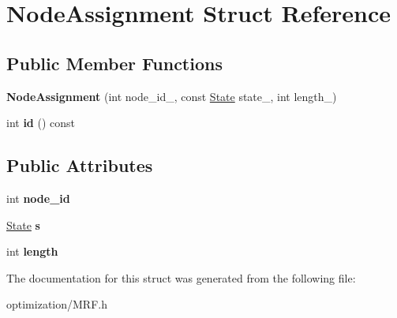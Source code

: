 \hypertarget{structNodeAssignment}{
\section{NodeAssignment Struct Reference}
\label{structNodeAssignment}
}
\subsection*{Public Member Functions}
\begin{DoxyCompactItemize}
\item 
\hypertarget{structNodeAssignment_afb4f063136a9da957865d42faa2a3943}{
{\bfseries NodeAssignment} (int node\_\-id\_\-, const \hyperlink{structState}{State} state\_\-, int length\_\-)}
\label{structNodeAssignment_afb4f063136a9da957865d42faa2a3943}

\item 
\hypertarget{structNodeAssignment_aea41536d91eba4d9c6440065953aa4e0}{
int {\bfseries id} () const }
\label{structNodeAssignment_aea41536d91eba4d9c6440065953aa4e0}

\end{DoxyCompactItemize}
\subsection*{Public Attributes}
\begin{DoxyCompactItemize}
\item 
\hypertarget{structNodeAssignment_a595045041aa245ed3108284223ce766d}{
int {\bfseries node\_\-id}}
\label{structNodeAssignment_a595045041aa245ed3108284223ce766d}

\item 
\hypertarget{structNodeAssignment_affe9bfbc195ba56f34dcdbd4fb10411e}{
\hyperlink{structState}{State} {\bfseries s}}
\label{structNodeAssignment_affe9bfbc195ba56f34dcdbd4fb10411e}

\item 
\hypertarget{structNodeAssignment_ac3b88ac2cbd270733ee835e00279a4ad}{
int {\bfseries length}}
\label{structNodeAssignment_ac3b88ac2cbd270733ee835e00279a4ad}

\end{DoxyCompactItemize}


The documentation for this struct was generated from the following file:\begin{DoxyCompactItemize}
\item 
optimization/MRF.h\end{DoxyCompactItemize}
